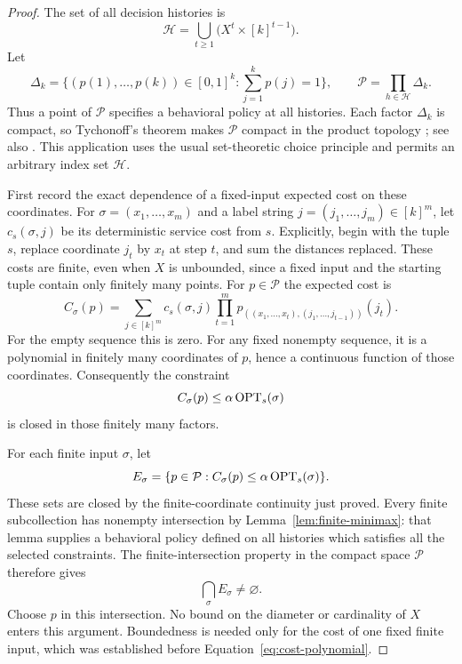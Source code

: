 \begin{proof}
The set of all decision histories is
\[
 \mathcal H=\bigcup_{t\ge1}\bigl(X^t\times[k]^{t-1}\bigr).
\]
Let
\[
 \Delta_k=\{(p(1),\ldots,p(k))\in[0,1]^k:
                       \textstyle\sum_{j=1}^kp(j)=1\},
 \qquad \mathcal P=\prod_{h\in\mathcal H}\Delta_k.
\]
Thus a point of $\mathcal P$ specifies a behavioral policy at all
histories. Each factor $\Delta_k$ is compact, so Tychonoff's theorem
makes $\mathcal P$ compact in the product topology
\cite[Chapter~5, Theorem~13]{Kelley55}; see also \cite{Tychonoff35}.
This application uses the usual set-theoretic
choice principle and permits an arbitrary index set $\mathcal H$.

First record the exact dependence of a fixed-input expected cost on
these coordinates.  For $\sigma=(x_1,\ldots,x_m)$ and a label string
$j=(j_1,\ldots,j_m)\in[k]^m$, let $c_s(\sigma,j)$ be its deterministic
service cost from $s$.  Explicitly, begin with the tuple $s$, replace
coordinate $j_t$ by $x_t$ at step $t$, and sum the distances replaced.
These costs are finite, even when $X$ is unbounded, since a fixed input
and the starting tuple contain only finitely many points.  For
$p\in\mathcal P$ the expected cost is
\begin{equation}
 C_\sigma(p)=\sum_{j\in[k]^m}c_s(\sigma,j)
       \prod_{t=1}^m
       p_{((x_1,\ldots,x_t),(j_1,\ldots,j_{t-1}))}(j_t).
 \label{eq:cost-polynomial}
\end{equation}
For the empty sequence this is zero.  For any fixed nonempty sequence,
it is a polynomial in finitely many coordinates of $p$, hence a
continuous function of those coordinates.  Consequently the constraint
\begin{equation}
 C_\sigma(p)\le\alpha\operatorname{OPT}_s(\sigma)
 \label{eq:closed-cost-constraint}
\end{equation}
is closed in those finitely many factors.

For each finite input $\sigma$, let
\[
 E_\sigma=\{p\in\mathcal P:
 C_\sigma(p)\le\alpha\operatorname{OPT}_s(\sigma)\}.
\]
These sets are closed by the finite-coordinate continuity just proved.
Every finite subcollection has nonempty intersection by
Lemma~\ref{lem:finite-minimax}: that lemma supplies a behavioral
policy defined on all histories which satisfies all the selected
constraints. The finite-intersection property in the compact space
$\mathcal P$ therefore gives
\[
                         \bigcap_\sigma E_\sigma\ne\varnothing.
\]
Choose $p$ in this intersection. No bound on the diameter or cardinality
of $X$ enters this argument. Boundedness is needed only for the cost of
one fixed finite input, which was established before
Equation~\eqref{eq:cost-polynomial}.


\end{proof}
